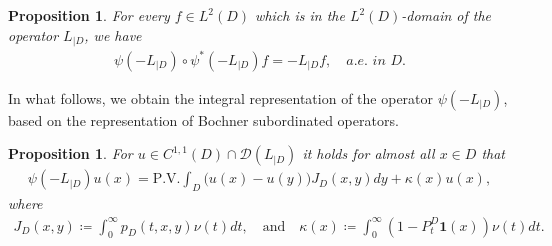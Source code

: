 \documentclass[12pt,a4paper,onecolumn]{article}
\newtheorem{prop}[thm]{Proposition}
\theoremstyle{definition}
\newcommand{\1}{\mathbf 1}
\newcommand{\DD}{\mathcal{D}}
\newcommand{\Lbase}{L_{|D}}
\newcommand{\Lo}{\psi(-L_{|D})}
\newcommand{\Los}{\psi^*(-L_{|D})}
\numberwithin{equation}{section}
\begin{document}
	\begin{prop}\label{p:composition-Lo}
		For every $f\in L^2(D)$ which is in the $L^2(D)$-domain of the operator
		$\Lbase$, we have
		\begin{align*}
			\Lo \circ \Los f=-L_{|D} f,\quad \textit{a.e. in $D$.}
		\end{align*}
	\end{prop}
		
	In what follows, we obtain the integral representation of the operator $\Lo$, based on the representation of Bochner subordinated operators.
	\begin{prop}\label{p:Lo pointwise}
		For $u\in C^{1,1}(D)\cap \DD(\Lbase)$ it holds for almost all $x\in D$ that
		\begin{align}\label{eq:Lo point}
			\Lo u(x)=\textrm{P.V.}\int_D \big(u(x)-u(y)\big)J_D(x,y)dy+\kappa(x)u(x),
		\end{align}
		where 
		\begin{align*}
			J_D(x,y)\coloneqq \int_0^\infty p_D(t,x,y)\nu(t)dt,\quad\text{and}\quad
			\kappa(x)\coloneqq \int_0^\infty\left(1-P_t^D\1(x)\right) \nu(t)dt.
		\end{align*}
	\end{prop}
	
\end{document}
